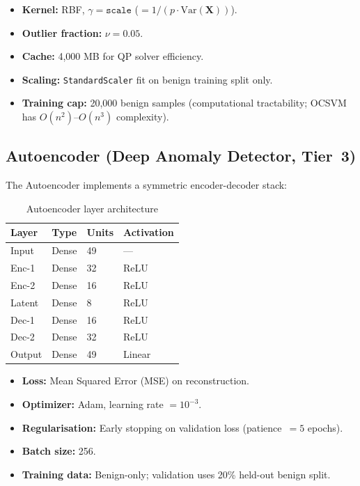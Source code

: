 \documentclass[10pt,conference]{IEEEtran}
\begin{document}
\begin{itemize}[leftmargin=*,noitemsep]
  \item \textbf{Kernel:} RBF, $\gamma = \texttt{scale}$
        ($= 1 / (p \cdot \text{Var}(\mathbf{X}))$).
  \item \textbf{Outlier fraction:} $\nu = 0.05$.
  \item \textbf{Cache:} 4{,}000 MB for QP solver efficiency.
  \item \textbf{Scaling:} \texttt{StandardScaler} fit on benign
        training split only.
  \item \textbf{Training cap:} 20{,}000 benign samples (computational
        tractability; OCSVM has $O(n^2)$–$O(n^3)$ complexity).
\end{itemize}

\subsection{Autoencoder (Deep Anomaly Detector, Tier~3)}

The Autoencoder implements a symmetric encoder-decoder stack:

\begin{table}[htbp]
\centering
\caption{Autoencoder layer architecture}
\label{tab:ae_arch}
\begin{tabular}{llll}
\toprule
\textbf{Layer} & \textbf{Type} & \textbf{Units} & \textbf{Activation} \\
\midrule
Input    & Dense & 49   & ---  \\
Enc-1    & Dense & 32   & ReLU \\
Enc-2    & Dense & 16   & ReLU \\
Latent   & Dense & 8    & ReLU \\
Dec-1    & Dense & 16   & ReLU \\
Dec-2    & Dense & 32   & ReLU \\
Output   & Dense & 49   & Linear \\
\bottomrule
\end{tabular}
\end{table}

\begin{itemize}[leftmargin=*,noitemsep]
  \item \textbf{Loss:} Mean Squared Error (MSE) on reconstruction.
  \item \textbf{Optimizer:} Adam, learning rate $= 10^{-3}$.
  \item \textbf{Regularisation:} Early stopping on validation loss
        (patience~$= 5$ epochs).
  \item \textbf{Batch size:} 256.
  \item \textbf{Training data:} Benign-only; validation uses 20\%
        held-out benign split.
\end{itemize}
\end{document}
